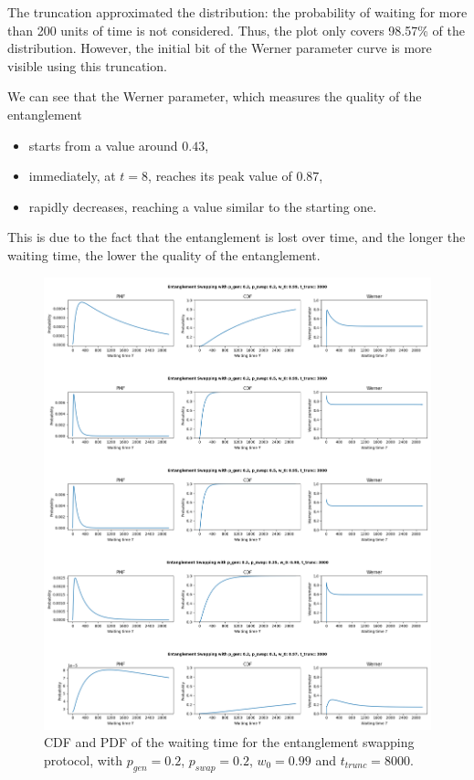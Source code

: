 \documentclass{masterthesis}
\begin{document}
The truncation approximated the distribution: the probability of waiting for more than 200 units of time is not considered. Thus, the plot only covers 98.57\% of the distribution. However, the initial bit of the Werner parameter curve is more visible using this truncation.

We can see that the Werner parameter, which measures the quality of the entanglement
\begin{itemize}
    \item starts from a value around $0.43$,
    \item immediately, at $t = 8$, reaches its peak value of $0.87$,
    \item rapidly decreases, reaching a value similar to the starting one.
\end{itemize}

This is due to the fact that the entanglement is lost over time, and the longer the waiting time, the lower the quality of the entanglement.
\begin{figure}[ht]
    \centering
    \includegraphics[width=1\linewidth]{images/swap_example_3000.png}
    \caption{CDF and PDF of the waiting time for the entanglement swapping protocol, with $p_{gen} = 0.2$, $p_{swap} = 0.2$, $w_0 = 0.99$ and $t_{trunc} = 8000$.}
    \label{fig:swap}
\end{figure}
\end{document}
